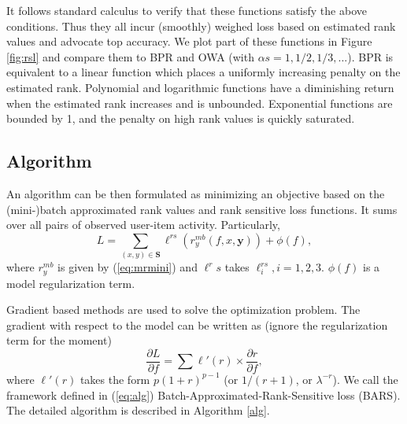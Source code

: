 \documentclass[letterpaper]{article} %
\begin{document}
It follows standard calculus to verify that these functions satisfy the above conditions. Thus they all incur (smoothly) weighed loss based on estimated rank values and advocate top accuracy. We plot part of these functions in Figure \ref{fig:rsl} and compare them to BPR and OWA (with ${\alpha}s=1, 1/2, 1/3, ...$). BPR is equivalent to a linear function which places a uniformly increasing penalty on the estimated rank. Polynomial and logarithmic functions have a diminishing return when the estimated rank increases and is unbounded. Exponential functions are bounded by 1, and the penalty on high rank values is quickly saturated.%

\subsection{Algorithm}
An algorithm can be then formulated as minimizing an objective based on the (mini-)batch approximated rank values and rank sensitive loss functions. It sums over all pairs of observed user-item activity. Particularly,
\begin{equation}
\label{eq:alg}
L = \sum_{(x,y)\in \textbf{S}} \ell^{rs}(r^{mb}_y(f,x,\textbf{y})) + \phi(f),
\end{equation}
where $r_y^{mb}$ is given by (\ref{eq:mrmini}) and $\ell^rs$ takes $\ell^{rs}_i, i=1,2,3$. $\phi(f)$ is a model regularization term.

Gradient based methods are used to solve the optimization problem. The gradient with respect to the model can be written as (ignore the regularization term for the moment)
\begin{equation}
\label{eq:gradient}
\frac{\partial L}{\partial f} = \sum \ell'(r) \times \frac{\partial r}{\partial f},
\end{equation}
where $\ell'(r)$ takes the form $p(1+r)^{p-1}$ (or $1/(r+1)$, or $\lambda^{-r}$). We call the framework defined in (\ref{eq:alg}) Batch-Approximated-Rank-Sensitive loss (BARS). The detailed algorithm is described in Algorithm \ref{alg}.
\end{document}
